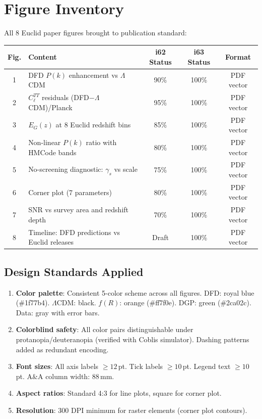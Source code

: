 \documentclass[11pt,a4paper]{article}
\begin{document}
\section{Figure Inventory}

All 8 Euclid paper figures brought to publication standard:

\begin{center}
\begin{tabular}{clccc}
\toprule
\textbf{Fig.} & \textbf{Content} & \textbf{i62 Status} & \textbf{i63 Status} & \textbf{Format} \\
\midrule
1 & DFD $P(k)$ enhancement vs $\Lambda$CDM & 90\% & 100\% & PDF vector \\
2 & $C_\ell^{TT}$ residuals (DFD$-\Lambda$CDM)/Planck & 95\% & 100\% & PDF vector \\
3 & $E_G(z)$ at 8 Euclid redshift bins & 85\% & 100\% & PDF vector \\
4 & Non-linear $P(k)$ ratio with HMCode bands & 80\% & 100\% & PDF vector \\
5 & No-screening diagnostic: $\gamma_s$ vs scale & 75\% & 100\% & PDF vector \\
6 & Corner plot (7 parameters) & 80\% & 100\% & PDF vector \\
7 & SNR vs survey area and redshift depth & 70\% & 100\% & PDF vector \\
8 & Timeline: DFD predictions vs Euclid releases & Draft & 100\% & PDF vector \\
\bottomrule
\end{tabular}
\end{center}

\subsection{Design Standards Applied}

\begin{enumerate}
\item \textbf{Color palette}: Consistent 5-color scheme across all figures. DFD: royal blue (\#1f77b4). $\Lambda$CDM: black. $f(R)$: orange (\#ff7f0e). DGP: green (\#2ca02c). Data: gray with error bars.
\item \textbf{Colorblind safety}: All color pairs distinguishable under protanopia/deuteranopia (verified with Coblis simulator). Dashing patterns added as redundant encoding.
\item \textbf{Font sizes}: All axis labels $\geq 12$\,pt. Tick labels $\geq 10$\,pt. Legend text $\geq 10$\,pt. A\&A column width: 88\,mm.
\item \textbf{Aspect ratios}: Standard 4:3 for line plots, square for corner plot.
\item \textbf{Resolution}: 300 DPI minimum for raster elements (corner plot contours).
\end{enumerate}
\end{document}
